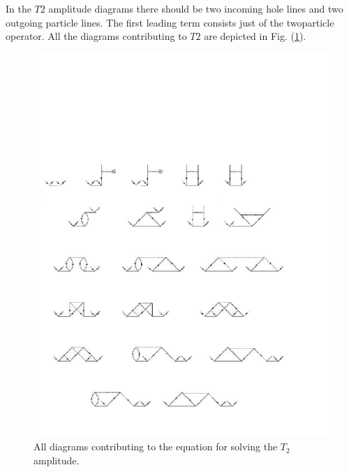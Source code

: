
In the $T2$ amplitude diagrams there should be two incoming hole lines and
two outgoing particle lines. The first leading term consists just of the 
twoparticle operator. All the diagrams contributing to $T2$ are depicted in 
Fig. (\ref{t2_eqn_diag}).
\clearpage

\begin{figure}[htp]
\centering
\includegraphics[scale=0.5]{CCD_diag}%
\caption{All diagrams contributing to the equation for solving the
$T_2$ amplitude.}
\label{t2_eqn_diag}
\end{figure}


